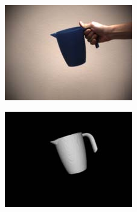 \begin{figure}
  \begin{center}
    \begin{subfigure}[b]{.3\textwidth}
      \includegraphics[width=1\linewidth]{bilder/shape/-008.jpg}
    \end{subfigure}
    \begin{subfigure}[b]{.3\textwidth}
      \includegraphics[width=1\linewidth]{bilder/shape/-006.jpg}
    \end{subfigure}\\
    \begin{subfigure}[b]{.3\textwidth}

\end{subfigure}
\end{center}
\end{figure}
